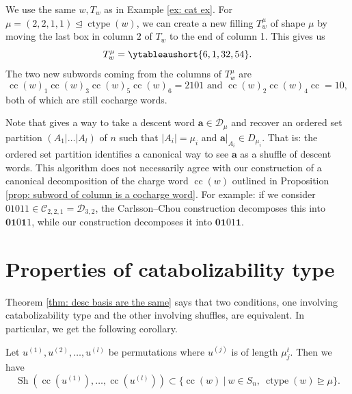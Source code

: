 \documentclass[ALCO, Unicode]{cedram}
\DeclareMathOperator{\ctype}{ctype}
\DeclareMathOperator{\sh}{Sh}
\DeclareMathOperator{\cc}{cc}
\begin{document}
\begin{ex}
We use the same $w, T_w$ as in Example \ref{ex: cat ex}.
For $\mu = (2,2,1,1) \unlhd \ctype(w)$, we can create a new filling $T_w^{\mu}$ of shape $\mu$ by moving the last box in column $2$ of $T_w$ to the end of column 1. This gives us \[T_w^{\mu} = \ytableaushort{6,1,32,54}.\] The two new subwords coming from the columns of $T_w^{\mu}$ are \[\cc(w)_1\cc(w)_3\cc(w)_5\cc(w)_6 = 2101 \text{ and } \cc(w)_2\cc(w)_4\cc = 10,\] both of which are still cocharge words. 
\end{ex}

\begin{rema}
    Note that \cite[Algorithm 1]{CC} gives a way to take a descent word $\mathbf{a}\in \mathcal{D}_\mu$ and recover an ordered set partition $(A_1|\dots|A_l)$ of $n$ such that $|A_i| = \mu_i$ and $\mathbf{a}\vert_{A_i}\in D_{\mu_i}$. That is: the ordered set partition identifies a canonical way to see $\mathbf{a}$ as a shuffle of descent words. This algorithm does not necessarily agree with our construction of a canonical decomposition of the charge word $\cc(w)$ outlined in Proposition \ref{prop: subword of column is a cocharge word}.
    For example: if we consider $01011\in \mathcal{C}_{2,2,1} = \mathcal{D}_{3,2}$, the Carlsson--Chou construction decomposes this into $\mathbf{01}0\mathbf{1}1$, while our construction decomposes it into $\mathbf{01}01\mathbf{1}$.
\end{rema}

\section{Properties of catabolizability type}\label{section:ctype sum}
Theorem \ref{thm: desc basis are the same} says that two conditions, one involving catabolizability type and the other involving shuffles, are equivalent. In particular, we get the following corollary.

\begin{coro}\label{cor: shuffles of cocharge words have correct ctype}
    Let $u^{(1)}, u^{(2)}, \dots, u^{(l)}$ be permutations where $u^{(j)}$ is of length $\mu_j^t$. Then we have \[\sh(\cc(u^{(1)}),\dots, \cc(u^{(l)})) \subset \{\cc(w) \ | \ w \in S_n, \ \ctype(w)\unrhd \mu\}.\]
\end{coro}
\end{document}
